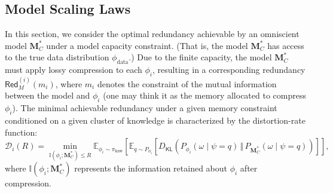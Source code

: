 \documentclass[11pt]{article}
\theoremstyle{plain}
\theoremstyle{definition}
\newcommand{\DKL}{D_{\mathsf{KL}}}
\newcommand{\Model}{\boldsymbol{M}}
\newcommand{\dataModel}{\phi_{\text{data}}}
\newcommand{\basemeasure}{\pi_{\text{knw}}}
\newcommand{\question}{\psi}
\newcommand{\answer}{\omega}
\newcommand{\ratedistortion}{\mathcal{D}}
\newcommand{\ferror}{\mathsf{Red}}
\newcommand{\modelerror}{\mathsf{Red}_M}
\begin{document}

\subsection{Model Scaling Laws}
\label{appsec:model scaling}


In this section, we consider the optimal redundancy achievable by an omniscient model \( \Model^*_C \) under a model capacity constraint. (That is, the model \( \Model^*_C \) has access to the true data distribution \( \dataModel \).)  
Due to the finite capacity, the model \( \Model^*_C \) must apply lossy compression to each \( \phi_i \), resulting in a corresponding redundancy \( \modelerror^{(i)}(m_i) \), where  \( m_i \) denotes the constraint of the mutual information between
the model and $\phi_i$ (one may think it as the memory allocated to compress \( \phi_i \)).
The minimal achievable redundancy under a given memory constraint conditioned on a given cluster of knowledge is characterized by the  distortion-rate function:
\[
\ratedistortion_i(R) = \min_{\mathbb{I}(\phi_i; \Model^*_C) \le R} \mathbb{E}_{\phi_i\sim \basemeasure}\left[\mathbb{E}_{q \sim P_{\phi_i}} \left[ \DKL\left( P_{\phi_i}(\answer \mid \question=q) \,\Vert\, P_{\Model^*_C}(\answer \mid \question=q) \right) \right]\right],
\]
where \( \mathbb{I}(\phi_i; \Model^*_C) \) represents the information retained about \( \phi_i \) after compression.  
\end{document}
